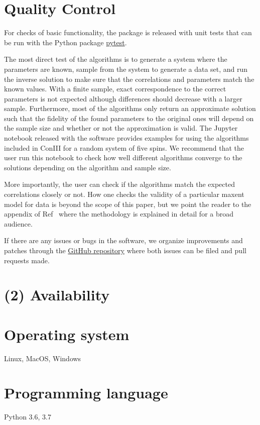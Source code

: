 \documentclass{jors}
\begin{document}
\section*{Quality Control}
For checks of basic functionality, the package is released with unit tests that can be run with the Python package \href{https://pytest.org}{pytest}.

The most direct test of the algorithms is to generate a system where the parameters are known, sample from the system to generate a data set, and run the inverse solution to make sure that the correlations and parameters match the known values. With a finite sample, exact correspondence to the correct parameters is not expected although differences should decrease with a larger sample. Furthermore, most of the algorithms only return an approximate solution such that the fidelity of the found parameters to the original ones will depend on the sample size and whether or not the approximation is valid. The Jupyter notebook released with the software provides examples for using the algorithms included in ConIII for a random system of five spins. We recommend that the user run this notebook to check how well different algorithms converge to the solutions depending on the algorithm and sample size.

More importantly, the user can check if the algorithms match the expected correlations closely or not. How one checks the validity of a particular maxent model for data is beyond the scope of this paper, but we point the reader to the appendix of Ref~\cite{Lee:2015ev} where the methodology is explained in detail for a broad audience.

If there are any issues or bugs in the software, we organize improvements and patches through  the \href{https://github.com/eltrompetero/coniii}{GitHub repository} where both issues can be filed and pull requests made. 


\section*{(2) Availability}
\vspace{0.5cm}
\section*{Operating system}
Linux, MacOS, Windows

\section*{Programming language}
Python 3.6, 3.7
\end{document}
